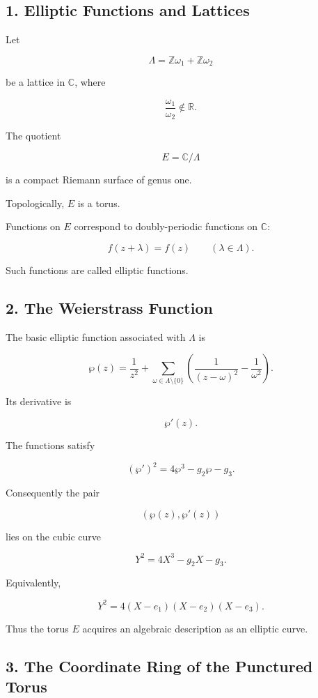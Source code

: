 \documentclass[12pt,a4paper]{article}
\theoremstyle{notespace}
\begin{document}
\subsection{1. Elliptic Functions and Lattices}

Let

\[
\Lambda=\mathbb Z\omega_1+\mathbb Z\omega_2
\]

be a lattice in \(\mathbb C\), where

\[
\frac{\omega_1}{\omega_2}\notin\mathbb R.
\]

The quotient

\[
E=\mathbb C/\Lambda
\]

is a compact Riemann surface of genus one.

Topologically, \(E\) is a torus.

Functions on \(E\) correspond to doubly-periodic functions on \(\mathbb C\):

\[
f(z+\lambda)=f(z)
\qquad
(\lambda\in\Lambda).
\]

Such functions are called elliptic functions.

\subsection{2. The Weierstrass Function}

The basic elliptic function associated with \(\Lambda\) is

\[
\wp(z)
=
\frac{1}{z^2}
+
\sum_{\omega\in\Lambda\setminus\{0\}}
\left(
\frac{1}{(z-\omega)^2}
-
\frac{1}{\omega^2}
\right).
\]

Its derivative is

\[
\wp'(z).
\]

The functions satisfy

\[
(\wp')^2
=
4\wp^3-g_2\wp-g_3.
\]

Consequently the pair

\[
(\wp(z),\wp'(z))
\]

lies on the cubic curve

\[
Y^2
=
4X^3-g_2X-g_3.
\]

Equivalently,

\[
Y^2
=
4(X-e_1)(X-e_2)(X-e_3).
\]

Thus the torus \(E\) acquires an algebraic description as an elliptic curve.

\subsection{3. The Coordinate Ring of the Punctured Torus}
\end{document}
